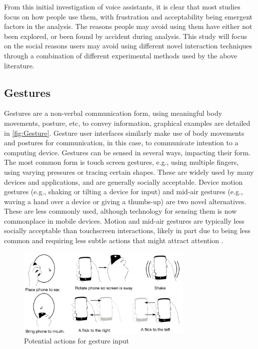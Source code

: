 \documentclass{l4proj}
\begin{document}
From this initial investigation of voice assistants, it is clear that most studies focus on how people use them, with frustration and acceptability being emergent factors in the analysis. The reasons people may avoid using them have either not been explored, or been found by accident during analysis. This study will focus on the social reasons users may avoid using different novel interaction techniques through a combination of different experimental methods used by the above literature.

\subsection{Gestures}

Gestures are a non-verbal communication form, using meaningful body movements, posture, etc, to convey information, graphical examples are detailed in \autoref{fig:Gesture}. Gesture user interfaces similarly make use of body movements and postures for communication, in this case, to communicate intention to a computing device. Gestures can be sensed in several ways, impacting their form. The most common form is touch screen gestures, e.g., using multiple fingers, using varying pressures or tracing certain shapes. These are widely used by many devices and applications, and are generally socially acceptable. Device motion gestures (e.g., shaking or tilting a device for input) and mid-air gestures (e.g., waving a hand over a device or giving a thumbs-up) are two novel alternatives. These are less commonly used, although technology for sensing them is now commonplace in mobile devices. Motion and mid-air gestures are typically less socially acceptable than touchscreen interactions, likely in part due to being less common and requiring less subtle actions that might attract attention \citep{rico_usable_2010}.

\begin{figure}[!htb]
    \centering
    \includegraphics[width=0.75\textwidth]{images/gestures.png}
        \caption{Potential actions for gesture input}
        \label{fig:Gesture}
\end{figure}
\end{document}
